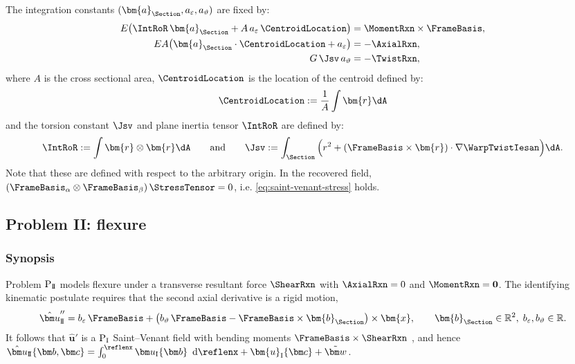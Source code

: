 The integration constants \((\bm{a}_{\Section},a_{\varepsilon},a_\vartheta)\) are fixed by:
%
\begin{equation}
\begin{aligned}
E\big(\IntRoR\,\bm{a}_{\Section}+A\,a_{\varepsilon}\,\CentroidLocation\big)&=\MomentRxn\times\FrameBasis,\\
EA\big(\bm{a}_{\Section}\cdot\CentroidLocation+a_{\varepsilon}\big)&=-\AxialRxn,\\
G\,\Jsv\,a_\vartheta&=-\TwistRxn,
\end{aligned}
\label{eq:2-15}
\end{equation}
where \(A\) is the cross sectional area, \(\CentroidLocation\) is the location of the centroid defined by:
\begin{equation}
\CentroidLocation := \frac{1}{A}\int \bm{r}\dA 
\label{eq:def-centroid}
\end{equation}
and the torsion constant \(\Jsv\) and plane inertia tensor \(\IntRoR\) are defined by:
\begin{equation}
\IntRoR := \int \bm{r}\otimes\bm{r}\dA
\qquad\text{and}\qquad
\Jsv:=\int_\Section\Big(r^2+(\FrameBasis\times\bm{r})\cdot\nabla\WarpTwistIesan\Big)\dA .
\label{eq:def-j-origin}
\end{equation}
Note that these are defined with respect to the arbitrary origin. 
In the recovered field, \((\FrameBasis_\alpha\otimes\FrameBasis_\beta)\,\StressTensor=0\), i.e. \eqref{eq:saint-venant-stress} holds.

\subsection{Problem II: flexure}

\subsubsection*{Synopsis}
Problem \(\mathrm{P}_{\rm I\!I}\) models flexure under a transverse resultant force \(\ShearRxn\) with \(\AxialRxn=0\) and \(\MomentRxn=\mathbf{0}\). 
The identifying kinematic postulate requires that the second axial derivative is a rigid motion,
\[
\hat{\bm u}_{\rm I\!I}''= b_{\varepsilon}\,\FrameBasis
+\big(b_{\vartheta}\,\FrameBasis-\FrameBasis\times\bm{b}_{\Section}\big)\times\bm{x},
\qquad
\bm{b}_{\Section}\in\mathbb{R}^2,\; b_{\varepsilon},b_{\vartheta}\in\mathbb{R}.
\]
It follows that \(\hat{\bm u}'\) is a \(\mathrm{P}_{\rm I}\) Saint–Venant field with bending moments \(\FrameBasis\times\ShearRxn\) %
, and hence
\(
\hat{\bm u}_{\rm I\!I}\{\bm b,\bm c\}=\int_0^{\reflenx}{\bm u}_{\rm I}\{\bm b\}\,\mathrm {~d}\reflenx+\bm{u}_{\rm I}\{\bm c\}+\tilde{\bm w}
\).


